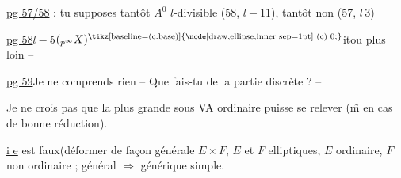 \quad \uline{pg 57/58} : tu supposes tantôt $A^0$ $l$-divisible (58, $l-11$), tantôt non (57, $l\,3$)

\uline{pg 58}\quad $l-5$\quad $({}_{p^\infty}X)^{\text{\tikz[baseline=(c.base)]{\node[draw,ellipse,inner sep=1pt] (c) {0};}}}$\quad {}\qquad itou plus loin --

\uline{pg 59}\qquad Je ne comprends rien -- Que fais-tu de la partie discrète ? --


Je ne crois pas que la plus grande  sous VA ordinaire puisse se relever (\~m en cas de bonne réduction).

\uline{i e} est faux\quad (déformer de façon générale $E\times F$, $E$ et $F$ elliptiques, $E$ ordinaire, $F$ non ordinaire ; général $\Rightarrow$ générique simple.
